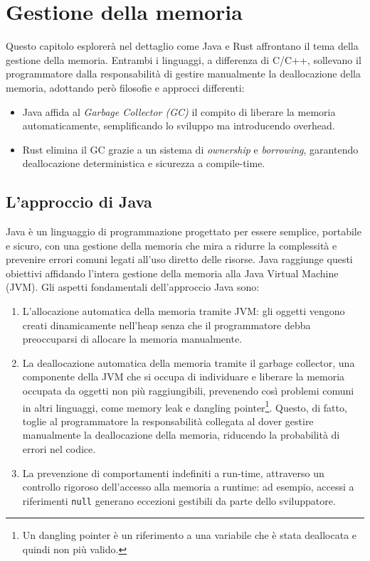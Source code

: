 
\chapter{Gestione della memoria}
Questo capitolo esplorerà nel dettaglio come Java e Rust affrontano il tema della gestione della memoria. Entrambi i linguaggi, a differenza di C/C++, sollevano il programmatore dalla responsabilità di gestire manualmente la deallocazione della memoria, adottando però filosofie e approcci differenti:
\begin{itemize}
    \item Java affida al \textit{Garbage Collector (GC)} il compito di liberare la memoria automaticamente, semplificando lo sviluppo ma introducendo overhead. 
    \item Rust elimina il GC grazie a un sistema di \textit{ownership} e \textit{borrowing}, garantendo deallocazione deterministica e sicurezza a compile-time. 
\end{itemize}
\section{L'approccio di Java}
Java è un linguaggio di programmazione progettato per essere semplice, portabile e sicuro, con una gestione della memoria che mira a ridurre la complessità e prevenire errori comuni legati all'uso diretto delle risorse. Java raggiunge questi obiettivi affidando l'intera gestione della memoria alla Java Virtual Machine (JVM). Gli aspetti fondamentali dell'approccio Java sono:

\begin{enumerate}
\item L'allocazione automatica della memoria tramite JVM: gli oggetti vengono creati dinamicamente nell'heap senza che il programmatore debba preoccuparsi di allocare la memoria manualmente. 
\item La deallocazione automatica della memoria tramite il garbage collector, una componente della JVM che si occupa di individuare e liberare la memoria occupata da oggetti non più raggiungibili, prevenendo così problemi comuni in altri linguaggi, come memory leak e dangling pointer\footnote{Un dangling pointer è un riferimento a una variabile che è stata deallocata e quindi non più valido.}. Questo, di fatto, toglie al programmatore la responsabilità collegata al dover gestire manualmente la deallocazione della memoria, riducendo la probabilità di errori nel codice.
\item La prevenzione di comportamenti indefiniti a run-time, attraverso un controllo rigoroso dell'accesso alla memoria a runtime: ad esempio, accessi a riferimenti \texttt{null} generano eccezioni gestibili da parte dello sviluppatore. 
\end{enumerate}

